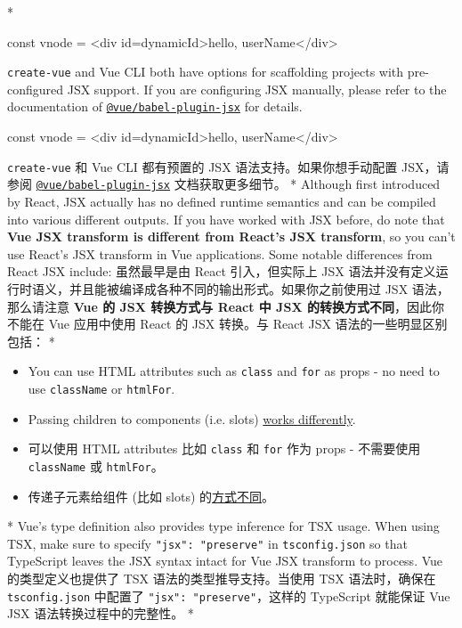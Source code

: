 \begin{paracol}{2}  

\switchcolumn[0]*%
\begin{codeHtml}
const vnode = <div id={dynamicId}>hello, {userName}</div>
\end{codeHtml}
\texttt{create-vue} and Vue CLI both have options for scaffolding
projects with pre-configured JSX support. If you are configuring JSX
manually, please refer to the documentation of
\href{https://github.com/vuejs/jsx-next}{\texttt{@vue/babel-plugin-jsx}}
for details.
\switchcolumn
\begin{codeHtml}
const vnode = <div id={dynamicId}>hello, {userName}</div>
\end{codeHtml}
\texttt{create-vue} 和 Vue CLI 都有预置的 JSX 语法支持。如果你想手动配置
JSX，请参阅
\href{https://github.com/vuejs/jsx-next}{\texttt{@vue/babel-plugin-jsx}}
文档获取更多细节。
\switchcolumn[0]*%
Although first introduced by React, JSX actually has no defined runtime
semantics and can be compiled into various different outputs. If you
have worked with JSX before, do note that \textbf{Vue JSX transform is
different from React's JSX transform}, so you can't use React's JSX
transform in Vue applications. Some notable differences from React JSX
include:
\switchcolumn
虽然最早是由 React 引入，但实际上 JSX
语法并没有定义运行时语义，并且能被编译成各种不同的输出形式。如果你之前使用过
JSX 语法，那么请注意 \textbf{Vue 的 JSX 转换方式与 React 中 JSX
的转换方式不同}，因此你不能在 Vue 应用中使用 React 的 JSX 转换。与 React
JSX 语法的一些明显区别包括：
\switchcolumn[0]*%
\begin{itemize}
\item
    You can use HTML attributes such as \texttt{class} and \texttt{for} as
    props - no need to use \texttt{className} or \texttt{htmlFor}.
\item
    Passing children to components (i.e. slots)
    \href{https://vuejs.org/guide/extras/render-function.html\#passing-slots}{works
differently}.
\end{itemize}
\switchcolumn
\begin{itemize}
\item
    可以使用 HTML attributes 比如 \texttt{class} 和 \texttt{for} 作为
    props - 不需要使用 \texttt{className} 或 \texttt{htmlFor}。
\item
    传递子元素给组件 (比如 slots)
    的\href{https://cn.vuejs.org/guide/extras/render-function.html\#passing-slots}{方式不同}。
\end{itemize}
\switchcolumn[0]*%
Vue's type definition also provides type inference for TSX usage. When
using TSX, make sure to specify \texttt{"jsx":\ "preserve"} in
\texttt{tsconfig.json} so that TypeScript leaves the JSX syntax intact
for Vue JSX transform to process.
\switchcolumn
Vue 的类型定义也提供了 TSX 语法的类型推导支持。当使用 TSX 语法时，确保在
\texttt{tsconfig.json} 中配置了 \texttt{"jsx":\ "preserve"}，这样的
TypeScript 就能保证 Vue JSX 语法转换过程中的完整性。
\switchcolumn[0]*%

\end{paracol}
